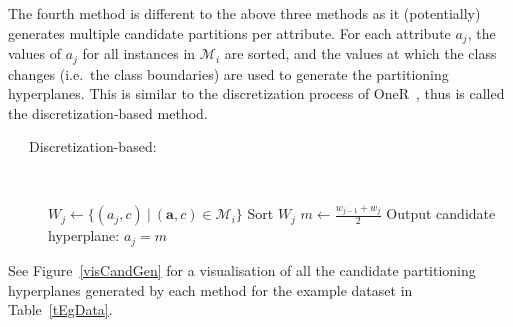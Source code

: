 \documentclass[a4paper,12pt]{report} %
\newcommand{\mcl}[1]{\mathcal{#1}}
\newcommand{\vect}[1]{\boldsymbol{#1}}
\begin{document}
The fourth method is different to the above three methods
        as it (potentially) generates multiple candidate partitions 
        per attribute.
    For each attribute $a_j$, 
        the values of $a_j$ for all instances in $\mcl{M}_i$ are sorted,
        and the values at which the class changes (i.e.\ the class boundaries)
        are used to generate the partitioning hyperplanes.
    This is similar to the discretization process of OneR~\cite{holte},
    	thus is called the discretization-based method.

\begin{description}
\item[~~~Discretization-based:] \ 
    \begin{algorithmic}
        \State $W_j \gets \{ (a_j,c) ~\big|~ (\vect{a},c) \in \mcl{M}_i \}$
        \State Sort $W_j$
            \State $m \gets \frac{w_{j-1}+w_j}{2}$
            \State Output candidate hyperplane: $a_j = m$
        \EndFor
    \EndFor
    \end{algorithmic}
\end{description}

See Figure~\ref{visCandGen} for a visualisation of all the 
    candidate partitioning hyperplanes generated by each method
    for the example dataset in Table~\ref{tEgData}.

\FloatBarrier
\end{document}
